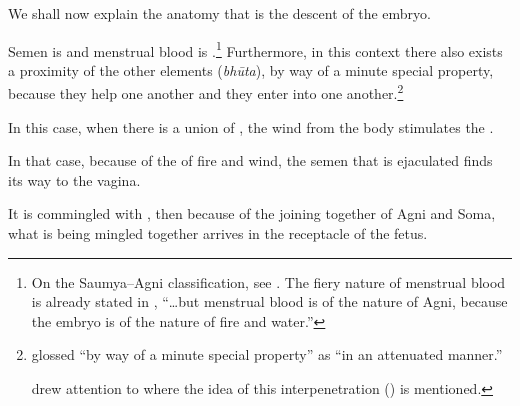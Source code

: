 \begin{translation}


\item[1] 

We shall now explain the anatomy that is the descent of the embryo. 


\item[3]

Semen is  and menstrual blood is
.\footnote{On the Saumya--Agni
    classification, see \cites{wuja-2004}{ange-2021}[521--527]{das-2003}. 
    The fiery nature of menstrual blood is already stated in
    , “\ldots but menstrual blood is of the nature of
    Agni, because the embryo is of the nature of fire and water.”} 
Furthermore, in this context there also exists a proximity of the
other elements (\emph{bhūta}), by way of a minute
special property,
because they help one another and they enter into one
another.\footnote{ glossed 
    “by way of a minute special property” as  “in an
    attenuated manner.”
        
         drew attention
        to  where the idea of this interpenetration
        () is mentioned.}


\item [4]

In this case, when there is a union of , the
wind from the body stimulates the .

In that case, because of the  of fire and
wind, the semen that is ejaculated finds its way to the vagina.

It is commingled with , then because
of the joining together of Agni and Soma, what is being mingled together
arrives in the receptacle of the fetus. 


\end{translation}
